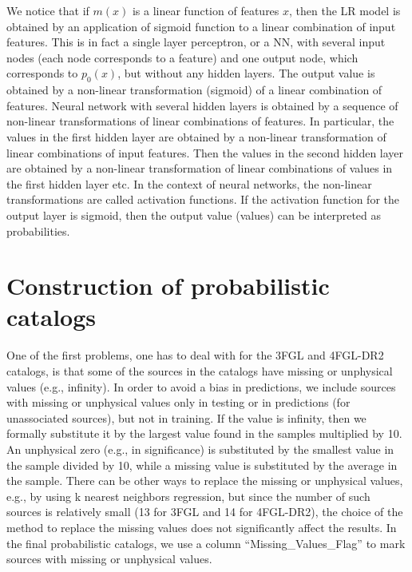 We notice that if $m(x)$ is a linear function of features $x$, then the LR model is obtained by an application of sigmoid function to a linear combination of input features.
This is in fact a single layer perceptron, or a NN, with several input nodes (each node corresponds to a feature) and one output node, which corresponds to $p_0(x)$, but without any hidden layers.
The output value is obtained by a non-linear transformation (sigmoid) of a linear combination of features.
Neural network with several hidden layers is obtained by a sequence of non-linear transformations of linear combinations of features.
In particular, the values in the first hidden layer are obtained by a non-linear transformation of linear combinations of input features.
Then the values in the second hidden layer are obtained by a non-linear transformation of linear combinations of values in the first hidden layer etc.
In the context of neural networks, the non-linear transformations are called activation functions.
If the activation function for the output layer is sigmoid, then the output value (values) can be interpreted as probabilities.


\section{Construction of probabilistic catalogs}

One of the first problems, one has to deal with for the 3FGL and 4FGL-DR2 catalogs, is that
some of the sources in the catalogs have missing or unphysical values (e.g., infinity).
In order to avoid a bias in predictions, we include sources with missing or unphysical values only in testing or in predictions (for unassociated sources), but not in training.
If the value is infinity, then we formally substitute it by the largest value found in the samples multiplied by 10.
An unphysical zero (e.g., in significance) is substituted by the smallest value in the sample divided by 10,
while a missing value is substituted by the average in the sample.
There can be other ways to replace the missing or unphysical values, e.g., by using k nearest neighbors regression, 
but since the number of such sources is relatively small (13 for 3FGL and 14 for 4FGL-DR2), 
the choice of the method to replace the missing values does not significantly affect the results.
In the final probabilistic catalogs, we use a column ``Missing\_Values\_Flag'' to mark sources with missing or unphysical values.


